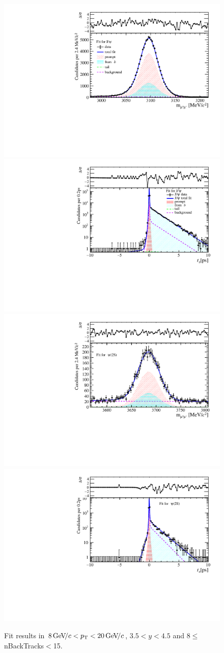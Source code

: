 \begin{figure}[H]
\begin{center}
\includegraphics[width=0.47\linewidth]{pdf/Jpsi/drawmassB/n2y3pt5.pdf}
\includegraphics[width=0.47\linewidth]{pdf/Jpsi/2DFitB/n2y3pt5.pdf}
\vspace*{-0.5cm}
\includegraphics[width=0.47\linewidth]{pdf/Psi2S/drawmassB/n2y3pt5.pdf}
\includegraphics[width=0.47\linewidth]{pdf/Psi2S/2DFitB/n2y3pt5.pdf}
\vspace*{-0.5cm}
\end{center}
\caption{Fit results in $8\text{\,Ge\kern -0.1em V\!/}c<p_{\mathrm{T}}<20\text{\,Ge\kern -0.1em V\!/}c$, $3.5<y<4.5$ and 8$\leq$nBackTracks$<$15.}
\label{Fitn2y3pt5}
\end{figure}
